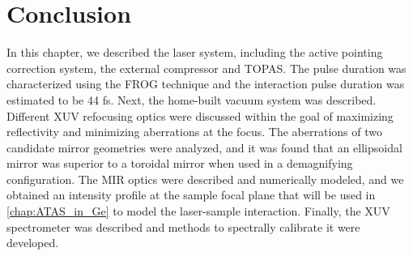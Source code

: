 \section{Conclusion}

In this chapter, we described the laser system, including the active pointing correction system, the external compressor and TOPAS. The pulse duration was characterized using the FROG technique and the interaction pulse duration was estimated to be 44 fs. Next, the home-built vacuum system was described. Different XUV refocusing optics were discussed within the goal of maximizing reflectivity and minimizing aberrations at the focus. The aberrations of two candidate mirror geometries were analyzed, and it was found that an ellipsoidal mirror was superior to a toroidal mirror when used in a demagnifying configuration. The MIR optics were described and numerically modeled, and we obtained an intensity profile at the sample focal plane that will be used in \cref{chap:ATAS_in_Ge} to model the laser-sample interaction. Finally, the XUV spectrometer was described and methods to spectrally calibrate it were developed.